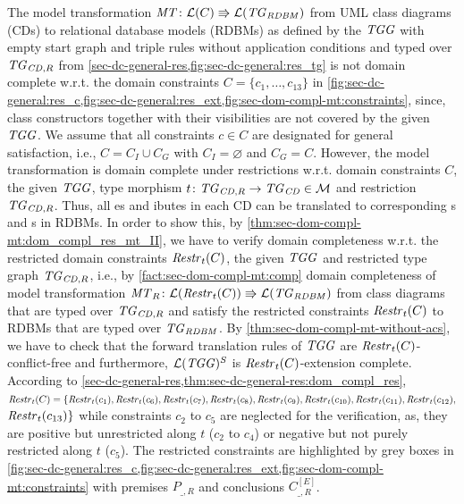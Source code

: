 \begin{example}
\label{fig:sec-dom-compl-mt:ex:dom_compl_1}
The model transformation $\mathit{MT}\colon \mathcal{L}(C) \Rrightarrow \mathcal{L}(\mathit{TG}_\mathit{RDBM})$ from UML class diagrams (CDs) to relational database models (RDBMs) as defined by the $\mathit{TGG}$ with empty start graph and triple rules without application conditions and typed over $\mathit{TG}_{\mathit{CD},R}$ from \cref{sec-dc-general-res,fig:sec-dc-general:res_tg} is not domain complete w.r.t. the domain constraints $C=\{c_1,\ldots,c_{13}\}$ in \cref{fig:sec-dc-general:res_c,fig:sec-dc-general:res_ext,fig:sec-dom-compl-mt:constraints}, since, class constructors together with their visibilities are not covered by the given $\mathit{TGG}$.
We assume that all constraints $c \in C$ are designated for general satisfaction, i.e., $C=C_I \cup C_G$ with $C_I=\varnothing$ and $C_G=C$.
However, the model transformation is domain complete under restrictions w.r.t. domain constraints $C$, the given $\mathit{TGG}$, type morphism $t\colon \mathit{TG}_{\mathit{CD},R} \to \mathit{TG}_\mathit{CD} \in {\cal M}$ and restriction $\mathit{TG}_{\mathit{CD},R}$.
Thus, all es and ibutes in each CD can be translated to corresponding s and s in RDBMs.
In order to show this, by \cref{thm:sec-dom-compl-mt:dom_compl_res_mt_II}, we have to verify domain completeness w.r.t. the restricted domain constraints $\mathit{Restr}_t(C)$, the given $\mathit{TGG}$ and restricted type graph $\mathit{TG}_{\mathit{CD},R}$, i.e., by \cref{fact:sec-dom-compl-mt:comp} domain completeness of model transformation $\mathit{MT}_R\colon \mathcal{L}(\mathit{Restr}_t(C)) \Rrightarrow \mathcal{L}(\mathit{TG}_\mathit{RDBM})$ from class diagrams that are typed over $\mathit{TG}_{\mathit{CD},R}$ and satisfy the restricted constraints $\mathit{Restr}_t(C)$ to RDBMs that are typed over $\mathit{TG}_\mathit{RDBM}$.
By \cref{thm:sec-dom-compl-mt-without-acs}, we have to check that the forward translation rules of $\mathit{TGG}$ are $\mathit{Restr}_t(C)$-conflict-free and furthermore, $\mathcal{L}(\mathit{TGG})^S$ is $\mathit{Restr}_t(C)$-extension complete.
According to \cref{sec-dc-general-res,thm:sec-dc-general-res:dom_compl_res}, $\mathit{Restr}_t(C)=\{\mathit{Restr}_t(c_1),\mathit{Restr}_t(c_6),\mathit{Restr}_t(c_7),\mathit{Restr}_t(c_8),\mathit{Restr}_t(c_9),\mathit{Restr}_t(c_{10}),\mathit{Restr}_t(c_{11}),\mathit{Restr}_t(c_{12}),$ $\mathit{Restr}_t(c_{13})\}$ while constraints $c_2$ to $c_5$ are neglected for the verification, as, they are positive but 
unrestricted along $t$ ($c_2$ to $c_4$) or negative but not purely restricted along $t$ ($c_5$).
The restricted constraints are highlighted by grey boxes in \cref{fig:sec-dc-general:res_c,fig:sec-dc-general:res_ext,fig:sec-dom-compl-mt:constraints} with premises $P_{\_,R}$ and conclusions $C^{[E]}_{\_,R}$.

\end{example}
